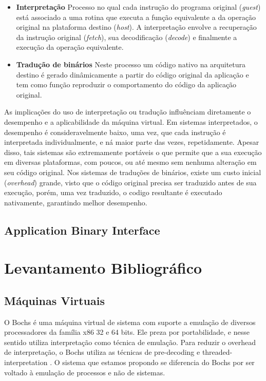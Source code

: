 \documentclass[11pt,twoside]{article}
\begin{document}
\begin{itemize}
 \item \textbf{Interpretação} Processo no qual cada instrução do programa original (\emph{guest}) está associado a uma rotina que executa a função equivalente a da operação original na plataforma destino (\emph{host}).
A interpretação envolve a recuperação da instrução original (\emph{fetch}), sua decodificação (\emph{decode}) e finalmente a execução da operação equivalente.
 \item \textbf{Tradução de binários} Neste processo um código nativo na arquitetura destino é gerado dinâmicamente a partir do código original da aplicação e tem como função reproduzir o comportamento do código da aplicação original\cite{Sites1993}. 
\end{itemize}

As implicações do uso de interpretação ou tradução influênciam diretamente o desempenho e a aplicabilidade da máquina virtual.
Em sistemas interpretados, o desempenho é consideravelmente baixo, uma vez, que cada instrução é interpretada individualmente, e ná maior parte das vezes, repetidamente.
Apesar disso, tais sistemas são extremamente portáveis o que permite que a sua execução em diversas plataformas, com poucos, ou até mesmo sem nenhuma alteração em seu código original.
Nos sistemas de traduções de binários, existe um custo inicial (\emph{overhead}) grande, visto que o código original precisa ser traduzido antes de sua execução, porém, uma vez traduzido, o codigo resultante é executado nativamente, garantindo melhor desempenho.

 \subsection{Application Binary Interface}

\section{Levantamento Bibliográfico}

\subsection{Máquinas Virtuais}
O Bochs \cite{Lawton1996} é uma máquina virtual de sistema com suporte a emulação de diversos processadores da família x86 32 e 64 bits. 
Ele preza por portabilidade, e nesse sentido utiliza interpretação como técnica de emulação. Para reduzir o overhead de interpretação, o Bochs utiliza as técnicas de pre-decoding \cite{Smith2005} e threaded-interpretation \cite{Klint1981}.
O sistema que estamos propondo se diferencia do Bochs por ser voltado à emulação de processos e não de sistemas.
\end{document}
